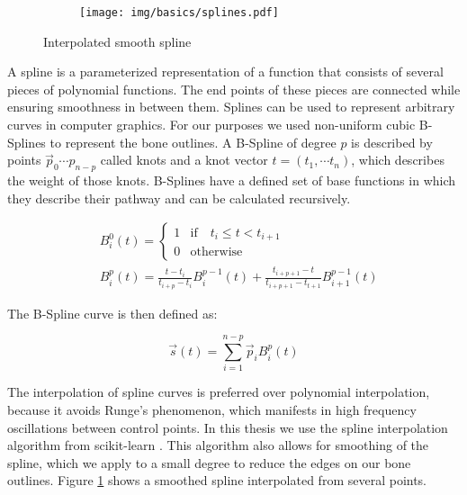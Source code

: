 \documentclass[pdftex,12pt,a4paper]{report}
\begin{document}
\begin{figure}[h]
	\centering
	\begin{subfigure}[b]{0.3\textwidth}
		\centering
		\texttt{[image: img/basics/splines.pdf]}
	\end{subfigure}
	\caption{Interpolated smooth spline}
	\label{fig:basics-splines}
\end{figure}

A spline is a parameterized representation of a function that consists of several pieces of polynomial functions. The end points of these pieces are connected while ensuring smoothness in between them. Splines can be used to represent arbitrary curves in computer graphics. For our purposes we used non-uniform cubic B-Splines to represent the bone outlines. A B-Spline of degree $p$ is described by points $\vec{p}_0 \cdots p_{n-p}$ called knots and a knot vector $t = (t_1, \cdots t_{n})$, which describes the weight of those knots.  B-Splines have a defined set of base functions in which they describe their pathway and can be calculated recursively.

\begin{equation}
\begin{split}
& B_i^0(t) = \left\{
\begin{matrix} 
1 & \mathrm{if} \quad t_i \leq t < t_{i+1} \\
0 & \mathrm{otherwise} 
\end{matrix} \right. \\
& B_i^p(t) = \frac{t - t_i}{t_{i+p} - t_i} B_i^{p-1}(t) + \frac{t_{i+p+1} - t}{t_{i+p+1} - t_{t+1}} B_{i+1}^{p-1}(t)
\end{split} 
\end{equation}

The B-Spline curve is then defined as:

\begin{equation}
\vec{s}(t) =  \sum_{i=1}^{n-p} \vec{p}_i B_i^p(t)
\end{equation}

The interpolation of spline curves is preferred over polynomial interpolation, because it avoids Runge's phenomenon, which manifests in high frequency oscillations between control points. In this thesis we use the spline interpolation algorithm from scikit-learn \cite{pedregosa2011scikit}. This algorithm also allows for smoothing of the spline, which we apply to a small degree to reduce the edges on our bone outlines. Figure \ref{fig:basics-splines} shows a smoothed spline interpolated from several points.
\end{document}
